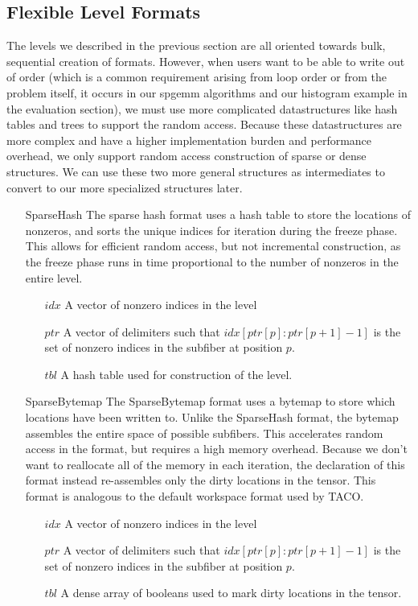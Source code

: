 \subsection{Flexible Level Formats}
The levels we described in the previous section are all oriented towards bulk,
sequential creation of formats. However, when users want to be able to write out
of order (which is a common requirement arising from loop order or from the
problem itself, it occurs in our spgemm algorithms and our histogram example in
the evaluation section), we must use more complicated datastructures like hash
tables and trees to support the random access. Because these datastructures are
more complex and have a higher implementation burden and performance overhead,
we only support random access construction of sparse or dense structures.  We
can use these two more general structures as intermediates to convert to our
more specialized structures later.

\begin{enumerate}
\item[SparseHash]
    The sparse hash format uses a hash table to store the locations of nonzeros,
    and sorts the unique indices for iteration during the freeze phase. This
    allows for efficient random access, but not incremental construction, as the
    freeze phase runs in time proportional to the number of nonzeros in the
    entire level.
    \begin{enumerate}
        \item[$idx$] A vector of nonzero indices in the level
        \item[$ptr$] A vector of delimiters such that $idx[ptr[p]:ptr[p+1] - 1]$ is the set of nonzero indices in the subfiber at position $p$.
        \item[$tbl$] A hash table used for construction of the level.
    \end{enumerate}
\item[SparseBytemap]
    The SparseBytemap format uses a bytemap to store which locations have been
    written to. Unlike the SparseHash format, the bytemap assembles the entire
    space of possible subfibers. This accelerates random access in the format,
    but requires a high memory overhead. Because we don't want to reallocate all
    of the memory in each iteration, the declaration of this format instead
    re-assembles only the dirty locations in the tensor. This format is
    analogous to the default workspace format used by TACO.
    \begin{enumerate}
        \item[$idx$] A vector of nonzero indices in the level
        \item[$ptr$] A vector of delimiters such that $idx[ptr[p]:ptr[p+1] - 1]$ is the set of nonzero indices in the subfiber at position $p$.
        \item[$tbl$] A dense array of booleans used to mark dirty locations in the tensor.
    \end{enumerate}
\end{enumerate}

